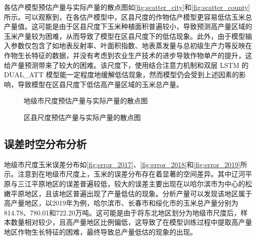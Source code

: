 \par 各估产模型预估产量与实际产量的散点图如\autoref{fig:scatter_city}和\autoref{fig:scatter_county}所示。可以观察到，在各估产模型中，区县尺度的作物估产模型更容易低估玉米总产量值。这可能是由于区县尺度下玉米种植面积普遍较小，导致预测高产量区域的玉米产量较为困难，从而导致了模型在区县尺度下的低估现象。此外，由于模型输入参数仅包含了如地表反射率、叶面积指数、地表蒸发量与总初级生产力等反映在作物生长特征的数据，并没有考虑到农业生产技术的进步导致作物单产的提升，这给产量预测带来了较大的困难。该尺度下，使用结合注意力机制和双层 LSTM 的 DUAL\_ATT 模型能一定程度地缓解低估现象，然而模型仍会受到上述因素的影响，导致模型在区县尺度下低估高产量区域的玉米总产量。

\begin{figure}
  \centering
  \hfill
  \hfill
  \hfill
  \hfill
  \hfill
  \caption{地级市尺度预估产量与实际产量的散点图}
  \label{fig:scatter_city}
\end{figure}
\begin{figure}
  \centering
  \hfill
  \hfill
  \hfill
  \hfill
  \hfill
  \caption{区县尺度预估产量与实际产量的散点图}
  \label{fig:scatter_county}
\end{figure}

\subsection{误差时空分布分析}

\par 地级市尺度玉米误差分布如\autoref{fig:error_2017}、\autoref{fig:error_2018}和\autoref{fig:error_2019}所示。注意到在地级市尺度上，玉米的误差分布存在着显著的空间差异。其中辽河平原与三江平原地区的误差普遍较低，较大的误差主要出现在以哈尔滨市为中心的松嫩平原地区，且该地区普遍出现了产量低估的现象。分析产量可以发现该地区属于高产量地区，以2019年为例，哈尔滨市、长春市和绥化市的玉米总产量分别为814.78、780.01和722.20万吨。这可能是由于将东北地区划分为地级市尺度后，样本数量相对较少，且高产量地区比例偏低，这导致了在模型训练过程中提取高产量地区作物生长特征的困难，最终导致总产量低估的现象的出现。

